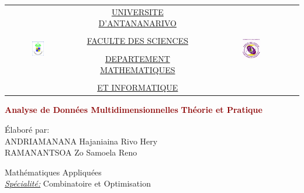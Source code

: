 \documentclass{article}
\begin{document}
\begin{titlepage}

\begin{center}
\begin{tabular}{ccc}
\multirow{7}{*}{\includegraphics[width=0.2\textwidth]{images/Ankatso.png}\hspace{0cm}} & 
\underline{\large{UNIVERSITE D'ANTANANARIVO}} &
\multirow{7}{*}{\hspace{0cm}\includegraphics[width=0.2\textwidth]{images/Sciences.png}} \\ & & \\ & 
\underline{\large{FACULTE DES SCIENCES}} & \\ & \\ & 
\underline{\large{DEPARTEMENT MATHEMATIQUES}} \\ & & \\ & 
\underline{\large{ET INFORMATIQUE}} \\
\end{tabular}
\end{center}

\vspace{4cm}
	
\begin{center}
\huge{\textbf{\textcolor{darkred}{Analyse de Données Multidimensionnelles}}}
\LARGE{\textbf{\textcolor{darkred}{Théorie et Pratique}}}
\end{center}

\vspace{3cm}

\begin{flushleft}
Élaboré par: \\
\large{ANDRIAMANANA Hajaniaina Rivo Hery} \\
\large{RAMANANTSOA Zo Samoela Reno} 
\newline

\large{Mathématiques Appliquées} \\
\large{\textit{\underline{Spécialité:}}} Combinatoire et Optimisation
\end{flushleft}
	
\vspace{3cm}
	

\end{titlepage}
\end{document}
